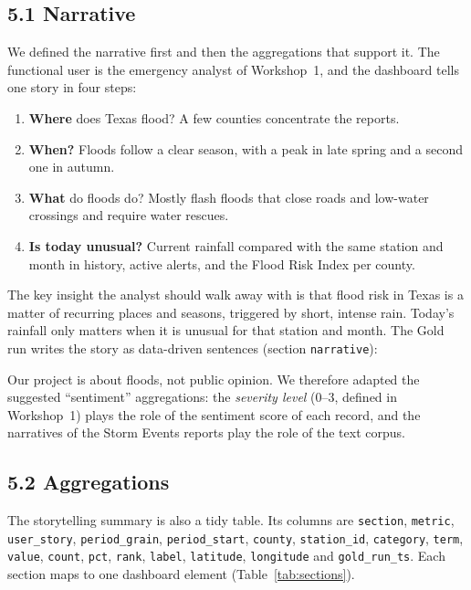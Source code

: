 \documentclass[stu, 12pt, letterpaper, donotrepeattitle, floatsintext, natbib]{apa7}
\begin{document}
\subsection{5.1 Narrative}
We defined the narrative first and then the aggregations that support it. The functional user is the emergency analyst of Workshop~1, and the dashboard tells one story in four steps:
\begin{enumerate}
    \item \textbf{Where} does Texas flood? A few counties concentrate the reports.
    \item \textbf{When?} Floods follow a clear season, with a peak in late spring and a second one in autumn.
    \item \textbf{What} do floods do? Mostly flash floods that close roads and low-water crossings and require water rescues.
    \item \textbf{Is today unusual?} Current rainfall compared with the same station and month in history, active alerts, and the Flood Risk Index per county.
\end{enumerate}
\noindent The key insight the analyst should walk away with is that flood risk in Texas is a matter of recurring places and seasons, triggered by short, intense rain. Today's rainfall only matters when it is unusual for that station and month. The Gold run writes the story as data-driven sentences (section \texttt{narrative}):


\noindent Our project is about floods, not public opinion. We therefore adapted the suggested ``sentiment'' aggregations: the \emph{severity level} (0--3, defined in Workshop~1) plays the role of the sentiment score of each record, and the narratives of the Storm Events reports play the role of the text corpus.

\subsection{5.2 Aggregations}
The storytelling summary is also a tidy table. Its columns are \texttt{section}, \texttt{metric}, \texttt{user\_story}, \texttt{period\_grain}, \texttt{period\_start}, \texttt{county}, \texttt{station\_id}, \texttt{category}, \texttt{term}, \texttt{value}, \texttt{count}, \texttt{pct}, \texttt{rank}, \texttt{label}, \texttt{latitude}, \texttt{longitude} and \texttt{gold\_run\_ts}. Each section maps to one dashboard element (Table~\ref{tab:sections}).
\end{document}
